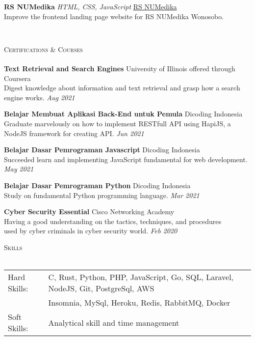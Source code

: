 \documentclass[a4paper]{article}
\newcommand{\lineunder} {
    \vspace*{-8pt} \\
    \hspace*{-18pt} \hrulefill \\
}
\newcommand{\header} [1] {
    {\hspace*{-18pt}\vspace*{6pt} \textsc{#1}}
    \vspace*{-6pt} \lineunder
}
\begin{document}
{\textbf{RS NUMedika}} {\sl HTML, CSS, JavaScript} \hfill \href{http://rsnuwonosobo.com/}{RS NUMedika}\\
Improve the frontend landing page website for RS NUMedika Wonosobo.\\
\vspace*{2mm}

\

\header{Certifications \& Courses}
\textbf{Text Retrieval and Search Engines} \hfill University of Illinois offered through Coursera\\
Digest knowledge about information and text retrieval and grasp how a search engine works. \hfill \textit{Aug 2021}\\
\vspace*{2mm}

\textbf{Belajar Membuat Aplikasi Back-End untuk Pemula} \hfill Dicoding Indonesia\\
Graduate marvelously on how to implement RESTfull API using HapiJS, a NodeJS framework for creating API. \hfill \textit{Jun 2021}\\
\vspace*{2mm}

\textbf{Belajar Dasar Pemrograman Javascript} \hfill Dicoding Indonesia\\
Succeeded learn and implementing JavaScript fundamental for web development. \hfill \textit{May 2021}\\
\vspace*{2mm}

\textbf{Belajar Dasar Pemrograman Python} \hfill Dicoding Indonesia\\
Study on fundamental Python programming language. \hfill \textit{Mar 2021}\\
\vspace*{2mm}

\textbf{Cyber Security Essential} \hfill Cisco Networking Academy\\
Having a good understanding on the tactics, techniques, and procedures \\used by cyber criminals in cyber security world. \hfill \textit{Feb 2020}\\
\vspace*{2mm}

\header{Skills}
\begin{tabular}{ l l }
	Hard Skills:              & C, Rust, Python, PHP, JavaScript, Go, SQL, Laravel, NodeJS, Git, PostgreSql, AWS\\ & Insomnia, MySql, Heroku, Redis, RabbitMQ, Docker\\
	Soft Skills:                    & Analytical skill and time management\\
\end{tabular}
\vspace{2mm}

\ 
\end{document}
